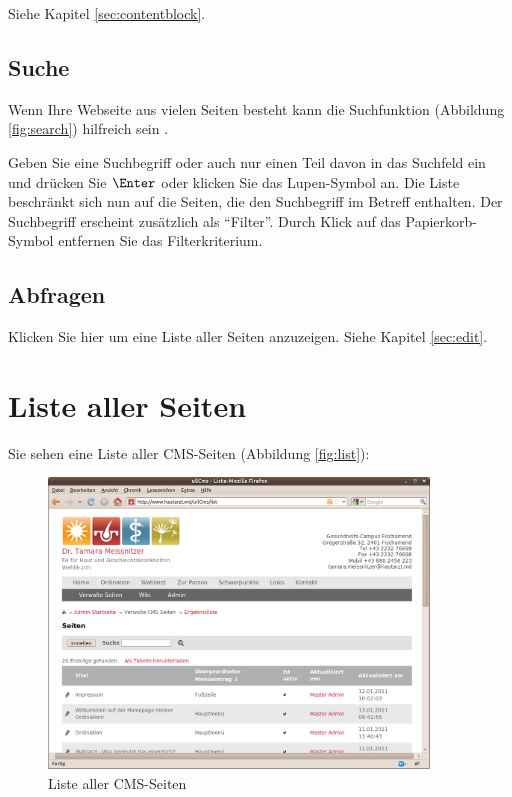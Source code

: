 \documentclass[article, a4paper, oneside, 11pt]{memoir}
\begin{document}
Siehe Kapitel \vref{sec:contentblock}.

\subsection{Suche}

Wenn Ihre Webseite aus vielen Seiten besteht kann die Suchfunktion (Abbildung \vref{fig:search}) hilfreich sein .

Geben Sie eine Suchbegriff oder auch nur einen Teil davon in das Suchfeld ein und drücken Sie $\Enter$ oder klicken Sie das Lupen-Symbol an.
Die Liste beschränkt sich nun auf die Seiten, die den Suchbegriff im Betreff enthalten. Der Suchbegriff erscheint zusätzlich als "`Filter"'. Durch Klick auf das Papierkorb-Symbol entfernen Sie das Filterkriterium.

\subsection{Abfragen}

Klicken Sie hier um eine Liste aller Seiten anzuzeigen. Siehe Kapitel \vref{sec:edit}.

\section{Liste aller Seiten}

Sie sehen eine Liste aller CMS-Seiten (Abbildung \vref{fig:list}):

\begin{figure}[htp]
\centering
\includegraphics[width=0.9\textwidth]{list}
\caption{Liste aller CMS-Seiten}
\label{fig:list}
\end{figure}
\end{document}
